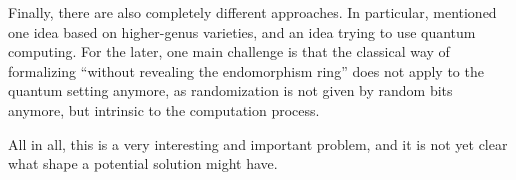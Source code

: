 Finally, there are also completely different approaches.
In particular, \cite{base_paper} mentioned one idea based on higher-genus varieties, and an idea trying to use quantum computing.
For the later, one main challenge is that the classical way of formalizing ``without revealing the endomorphism ring'' does not apply to the quantum setting anymore, as randomization is not given by random bits anymore, but intrinsic to the computation process.

All in all, this is a very interesting and important problem, and it is not yet clear what shape a potential solution might have. 